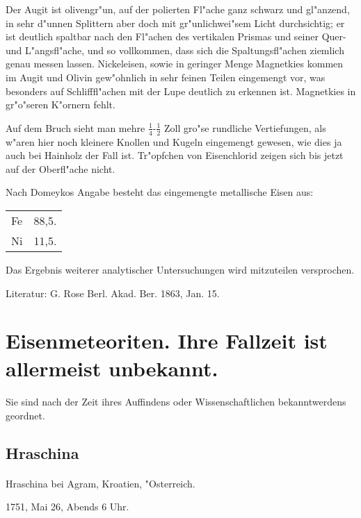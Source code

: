 \documentclass[a4paper, 11pt, oneside]{article}
\begin{document}
Der Augit ist olivengr"un, auf der polierten Fl"ache ganz schwarz und gl"anzend, in sehr d"unnen Splittern aber doch mit gr"unlichwei"sem Licht durchsichtig; er ist deutlich spaltbar nach den Fl"achen des vertikalen Prismas und seiner Quer- und L"angsfl"ache, und so vollkommen, dass sich die Spaltungsfl"achen ziemlich genau messen lassen. Nickeleisen, sowie in geringer Menge Magnetkies kommen im Augit und Olivin gew"ohnlich in sehr feinen Teilen eingemengt vor, was besonders auf Schlifffl"achen mit der Lupe deutlich zu erkennen ist. Magnetkies in gr"o"seren K"ornern fehlt.

Auf dem Bruch sieht man mehre $\frac{1}{4}$-$\frac{1}{2}$ Zoll gro"se rundliche Vertiefungen, als w"aren hier noch kleinere Knollen und Kugeln eingemengt gewesen, wie dies ja auch bei Hainholz der Fall ist. Tr"opfchen von Eisenchlorid zeigen sich bis jetzt auf der Oberfl"ache nicht.

Nach Domeykos Angabe besteht das eingemengte metallische Eisen aus:
\begin{table}[!ht]
    \centering
    \begin{tabular}{l l}
        Fe & 88,5. \\
        Ni & 11,5. \\
    \end{tabular}
\end{table}

Das Ergebnis weiterer analytischer Untersuchungen wird mitzuteilen versprochen.

\footnotesize
Literatur: G. Rose Berl. Akad. Ber. 1863, Jan. 15.
\clearpage
\section{Eisenmeteoriten. Ihre Fallzeit ist allermeist unbekannt.}
\normalsize
\paragraph{}
Sie sind nach der Zeit ihres Auffindens oder Wissenschaftlichen bekanntwerdens geordnet.
\subsection{Hraschina}
\paragraph{}
Hraschina bei Agram, Kroatien, "Osterreich.

1751, Mai 26, Abends 6 Uhr.
\end{document}
